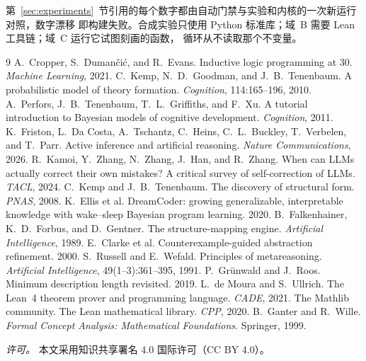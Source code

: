 \documentclass[11pt]{ctexart}
\begin{document}
第~\ref{sec:experiments}~节引用的每个数字都由自动门禁与实验和内核的一次新运行对照，数字漂移
即构建失败。合成实验只使用 Python 标准库；域~B 需要 Lean 工具链；域~C 运行它试图刻画的函数，
循环从不读取那个不变量。
\begin{thebibliography}{9}
\small
{} A.~Cropper, S.~Duman\v{c}i\'c, and R.~Evans.
  Inductive logic programming at 30. \emph{Machine Learning}, 2021.
 C.~Kemp, N.~D.~Goodman, and J.~B.~Tenenbaum.
  A probabilistic model of theory formation. \emph{Cognition}, 114:165--196, 2010.
 A.~Perfors, J.~B.~Tenenbaum, T.~L.~Griffiths, and F.~Xu.
  A tutorial introduction to Bayesian models of cognitive development. \emph{Cognition}, 2011.
 K.~Friston, L.~Da Costa, A.~Tschantz, C.~Heins, C.~L.~Buckley, T.~Verbelen,
  and T.~Parr. Active inference and artificial reasoning. \emph{Nature Communications}, 2026.
 R.~Kamoi, Y.~Zhang, N.~Zhang, J.~Han, and R.~Zhang.
  When can LLMs actually correct their own mistakes? A critical survey of self-correction of LLMs.
  \emph{TACL}, 2024.
 C.~Kemp and J.~B.~Tenenbaum. The discovery of structural form.
  \emph{PNAS}, 2008.
 K.~Ellis et al. DreamCoder: growing generalizable, interpretable knowledge
  with wake--sleep Bayesian program learning. 2020.
 B.~Falkenhainer, K.~D.~Forbus, and D.~Gentner.
  The structure-mapping engine. \emph{Artificial Intelligence}, 1989.
 E.~Clarke et al. Counterexample-guided abstraction refinement. 2000.
 S.~Russell and E.~Wefald. Principles of metareasoning.
  \emph{Artificial Intelligence}, 49(1--3):361--395, 1991.
 P.~Gr\"unwald and J.~Roos. Minimum description length revisited. 2019.
  L.~de Moura and S.~Ullrich. The Lean~4 theorem prover and programming language.
  \emph{CADE}, 2021.
  The Mathlib community. The Lean mathematical library. \emph{CPP}, 2020.
 B.~Ganter and R.~Wille. \emph{Formal Concept Analysis: Mathematical
  Foundations}. Springer, 1999.
\normalsize
\end{thebibliography}


\vspace{1em}
\noindent\small\textit{许可。} 本文采用知识共享署名 4.0 国际许可（CC BY 4.0）。
\end{document}

